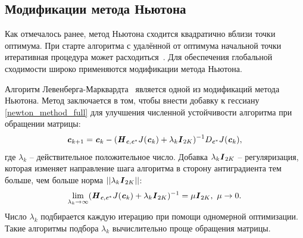 \subsection{Модификации метода Ньютона} \label{subsec:newton_modified}
Как отмечалось ранее, метод Ньютона сходится квадратично вблизи точки оптимума. При старте алгоритма с удалённой от оптимума начальной точки итеративная процедура может расходиться~\cite{polyak_optimiz}. Для обеспечения глобальной сходимости широко применяются модификации метода Ньютона.

Алгоритм Левенберга-Марквардта~\cite{polyak_optimiz} является одной из модификаций метода Ньютона. Метод заключается в том, чтобы внести добавку к гессиану \eqref{newton_method_full} для улучшения численной устойчивости алгоритма при обращении матрицы:
\begin{equation}
	\textbf{\textit{c}}_{k+1}=\textbf{\textit{c}}_{k}-(\textbf{\textit{H}}_{\textbf{\textit{c}}, \textbf{\textit{c}}^*}J(\textbf{\textit{c}}_{k})+
	\lambda_k\textbf{\textit{I}}_{2K})^{-1}D_{\textbf{\textit{c}}^*}J(\textbf{\textit{c}}_{k}),
	\label{newton_levenb_marq}
\end{equation}
где $\lambda_k$ -- действительное положительное число. Добавка $\lambda_k\textbf{\textit{I}}_{2K}$ -- регуляризация, которая изменяет направление шага алгоритма в сторону антиградиента тем больше, чем больше норма $||\lambda_k\textbf{\textit{I}}_{2K}||$:
\begin{equation*}
	\lim_{\lambda_k\rightarrow\infty}(\textbf{\textit{H}}_{\textbf{\textit{c}}, \textbf{\textit{c}}^*}J(\textbf{\textit{c}}_{k})+
	\lambda_k\textbf{\textit{I}}_{2K})^{-1}=\mu\textbf{\textit{I}}_{2K}, \ \mu\rightarrow 0.
\end{equation*}
Число $\lambda_k$ подбирается каждую итерацию при помощи одномерной оптимизации. Такие алгоритмы подбора $\lambda_k$ вычислительно проще обращения матрицы.

